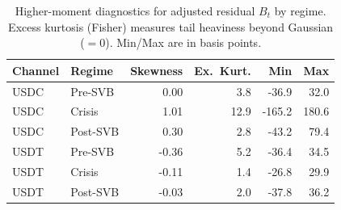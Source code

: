 \begin{table}[H]
\caption{Higher-moment diagnostics for adjusted residual $B_t$ by regime. Excess kurtosis (Fisher) measures tail heaviness beyond Gaussian ($=0$). Min/Max are in basis points.}
\label{tab:dist_robust}
\footnotesize
\begin{tabular}{llrrrr}
\toprule
Channel & Regime & Skewness & Ex.~Kurt. & Min & Max \\
\midrule
USDC & Pre-SVB & 0.00 & 3.8 & -36.9 & 32.0 \\
USDC & Crisis & 1.01 & 12.9 & -165.2 & 180.6 \\
USDC & Post-SVB & 0.30 & 2.8 & -43.2 & 79.4 \\
USDT & Pre-SVB & -0.36 & 5.2 & -36.4 & 34.5 \\
USDT & Crisis & -0.11 & 1.4 & -26.8 & 29.9 \\
USDT & Post-SVB & -0.03 & 2.0 & -37.8 & 36.2 \\
\bottomrule
\end{tabular}
\end{table}
